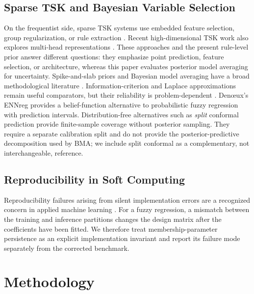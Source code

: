 \documentclass[1p,times]{elsarticle}
\begin{document}
\subsection{Sparse TSK and Bayesian Variable Selection}

On the frequentist side, sparse TSK systems use embedded feature selection, group regularization, or rule extraction \cite{kbs2024embedded,zhang2023sparse,neuralnet2024sparsetsk,xue2023dgaletsk}.
Recent high-dimensional TSK work also explores multi-head representations \cite{bian2025mhtsk}.
These approaches and the present rule-level prior answer different questions: they emphasize point prediction, feature selection, or architecture, whereas this paper evaluates posterior model averaging for uncertainty.
Spike-and-slab priors and Bayesian model averaging have a broad methodological literature \cite{mitchell1988bayesian,george1993variable,ishwaran2005spike,hoeting1999bayesian}.
Information-criterion and Laplace approximations remain useful comparators, but their reliability is problem-dependent \cite{gelfand1994bayesian,chipman2001practical,kasprzak2025laplace}.
Den{\oe}ux's ENNreg \cite{denoeux2023ennreg} provides a belief-function alternative to probabilistic fuzzy regression with prediction intervals.
Distribution-free alternatives such as \emph{split} conformal prediction \cite{vovk2005algorithmic,lei2018distributionfree} provide finite-sample coverage without posterior sampling.
They require a separate calibration split and do not provide the posterior-predictive decomposition used by BMA; we include split conformal as a complementary, not interchangeable, reference.

\subsection{Reproducibility in Soft Computing}

Reproducibility failures arising from silent implementation errors are a recognized concern in applied machine learning \cite{pineau2021improving}.
For a fuzzy regression, a mismatch between the training and inference partitions changes the design matrix after the coefficients have been fitted.
We therefore treat membership-parameter persistence as an explicit implementation invariant and report its failure mode separately from the corrected benchmark.

\section{Methodology}
\label{sec:method}
\end{document}
